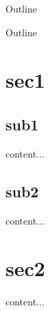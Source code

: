\documentclass{beamer}
\begin{document}
{
    \begin{frame}{Outline}
          \tableofcontents[
            currentsection
          ]
    \end{frame} 
    \addtocounter{framenumber}{-1}
    \begin{frame}{Outline}
    \end{frame}
}

\section{sec1}
\subsection{sub1}
\begin{frame}
content...
\end{frame}
\subsection{sub2}
\begin{frame}
content...
\end{frame}
\section{sec2}
\begin{frame}
content...
\end{frame}
\end{document}
